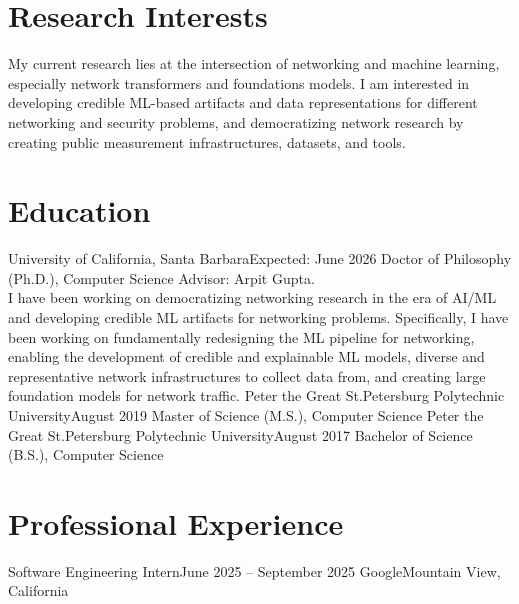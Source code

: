 \documentclass{scv}
\begin{document}

\section{Research Interests}
    \justifying
    My current research lies at the intersection of networking and machine learning, especially network transformers and foundations models. 
    I am interested in developing credible ML-based artifacts and data representations for different networking and security problems, and democratizing network research by creating public measurement infrastructures, datasets, and tools.

\section{Education}
  \resumeSubHeadingListStart
    \resumeSubheadingWithText
      {University of California, Santa Barbara}{Expected: June 2026}
      {Doctor of Philosophy (Ph.D.), Computer Science}{}
      {Advisor: Arpit Gupta.\\
        I have been working on democratizing networking research in the era of AI/ML and developing credible ML artifacts for networking problems.%
        Specifically, I have been working on fundamentally redesigning the ML pipeline for networking, enabling the development of credible and explainable ML models, diverse and representative network infrastructures to collect data from, and %
        creating large foundation models for network traffic.}{}
    \resumeSubheading
      {Peter the Great St.Petersburg Polytechnic University}{August 2019}
      {Master of Science (M.S.), Computer Science}{}
    \resumeSubheading
      {Peter the Great St.Petersburg Polytechnic University}{August 2017}
      {Bachelor of Science (B.S.), Computer Science}{}
  \resumeSubHeadingListEnd
    
\section{Professional Experience}
  \resumeSubHeadingListStart

    \resumeSubheading 
      {Software Engineering Intern}{June 2025 -- September 2025}
      {Google}{Mountain View, California}
      \resumeItemListStart
      \resumeItemListEnd
\end{document}
